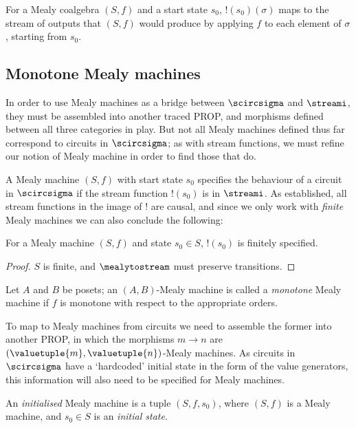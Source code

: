 For a Mealy coalgebra \((S, f)\) and a start state \(s_0\),
\(!(s_0)(\sigma)\) maps to the stream of outputs that \((S, f)\) would produce
by applying \(f\) to each element of \(\sigma\), starting from \(s_0\).

\subsection{Monotone Mealy machines}

In order to use Mealy machines as a bridge between \(\scircsigma\) and
\(\streami\), they must be assembled into another traced PROP, and morphisms
defined between all three categories in play.
But not all Mealy machines defined thus far correspond to circuits in
\(\scircsigma\); as with stream functions, we must refine our notion of Mealy
machine in order to find those that do.

A Mealy machine \((S, f)\) with start state \(s_0\) specifies the behaviour of a
circuit in \(\scircsigma\) if the stream function \(!(s_0)\) is in \(\streami\).
As established, all stream functions in the image of \(!\) are causal, and since
we only work with \emph{finite} Mealy machines we can also conclude the
following:

\begin{lemma}
    For a Mealy machine \((S, f)\) and state \(s_0 \in S\), \(!(s_0)\)
    is finitely specified.
\end{lemma}
\begin{proof}
    \(S\) is finite, and \(\mealytostream\) must preserve transitions.
\end{proof}


\begin{definition}
    Let \(A\) and \(B\) be posets; an \((A,B)\)-Mealy machine is called a
    \emph{monotone} Mealy machine if \(f\) is monotone with respect to the
    appropriate orders.
\end{definition}

To map to Mealy machines from circuits we need to assemble the former into
another PROP, in which the morphisms \(m \to n\) are
\((\valuetuple{m},\valuetuple{n})\)-Mealy machines.
As circuits in \(\scircsigma\) have a `hardcoded' initial state in the form of
the value generators, this information will also need to be specified for Mealy
machines.

\begin{definition}
    An \emph{initialised} Mealy machine is a tuple \((S, f, s_0)\), where
    \((S, f)\) is a Mealy machine, and \(s_0 \in S\) is an \emph{initial state}.
\end{definition}


